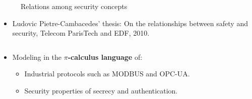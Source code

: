 \documentclass{beamer}
\newcommand{\modbus}{MODBUS\xspace}
\newcommand{\opcua}{OPC-UA\xspace}
\begin{document}
\begin{frame}[fragile]{}
\begin{columns}[T]
\begin{column}{.49\textwidth}
\begin{tcolorbox}[adjusted title={\centering\large Security concepts}]
                \begin{figure}[htb]
                    \resizebox{.85\columnwidth}{!}{
                        
                    }
                    \vspace{-.2cm}
                    \caption{Relations among security concepts}
                \end{figure}
                \vspace{-.5cm}
                \begin{itemize}
                    \item Ludovic Pietre-Cambacedes' thesis: On the relationships between safety and security, Telecom ParisTech and EDF, 2010.
                \end{itemize}
            \end{tcolorbox}
        \end{column}
    \end{columns}
    \vfill
    \begin{tcolorbox}[adjusted title={\centering\large Formal Analysis of SCADA Protocols}]
        \vspace{.5em}
        \begin{columns}[T]
            \begin{column}{.35\textwidth}
                \begin{tcolorbox}[
                colback=white, %
                colframe=normalTitleBlockColor, %
                colframe=gray!20, %
                boxrule=1mm,
                coltext=black, %
                coltitle=black, %
                bottom=2mm,
                equal height group=B,
                valign = center,
                adjusted title={\large Objectives}]
                    \vspace{.5em}
                    \begin{itemize}
                        \item Modeling in the {\bf $\pi$-calculus language} of:
                        \begin{itemize}
                            \item Industrial protocols such as \modbus and \opcua.
                            \item Security properties of secrecy and authentication.
                        \end{itemize}
                    \vspace{.5em}

\end{itemize}
\end{tcolorbox}
\end{column}
\end{columns}
\end{tcolorbox}
\end{frame}
\end{document}
